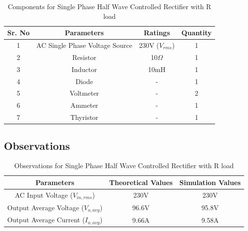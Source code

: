 \begin{table}[h]
    \renewcommand{\arraystretch}{1.3}
    \label{table_components_required_single-phase-half-wave-controlled-rectifier-with-R-load}
    \centering
    \begin{tabular}{|c|c|c|c|}
        \hline
        Sr. No & Parameters                     & Ratings            & Quantity \\
        \hline
        \hline
        1      & AC Single Phase Voltage Source & 230V ($ V_{rms} $) & 1        \\
        \hline
        2      & Resistor                       & 10$ \Omega $       & 1        \\
        \hline
        3      & Inductor                       & 10mH               & 1        \\
        \hline
        4      & Diode                          & -                  & 1        \\
        \hline
        5      & Voltmeter                      & -                  & 2        \\
        \hline
        6      & Ammeter                        & -                  & 1        \\
        \hline
        7      & Thyristor                      & -                  & 1        \\
        \hline
    \end{tabular}
    \caption{Components for Single Phase Half Wave Controlled Rectifier with R load}

\end{table}



\subsection{Observations}

\begin{table}[h]
    \renewcommand{\arraystretch}{1.3}
    \label{table_observation_single-phase-half-wave-controlled-rectifier-with-R-load}
    \centering
    \begin{tabular}{|c|c|c|}
        \hline
        Parameters                              & Theoretical Values & Simulation Values \\
        \hline
        \hline
        AC Input Voltage ($ V_{in,rms} $)       & 230V               & 230V              \\
        \hline
        Output Average Voltage ($ V_{o,avg} $)  & 96.6V              & 95.8V             \\
        \hline
        Output Average Current ($ I_{o,avg}  $) & 9.66A              & 9.58A             \\
        \hline
    \end{tabular}
    \caption{Observations for Single Phase Half Wave Controlled Rectifier with R load}

\end{table}


